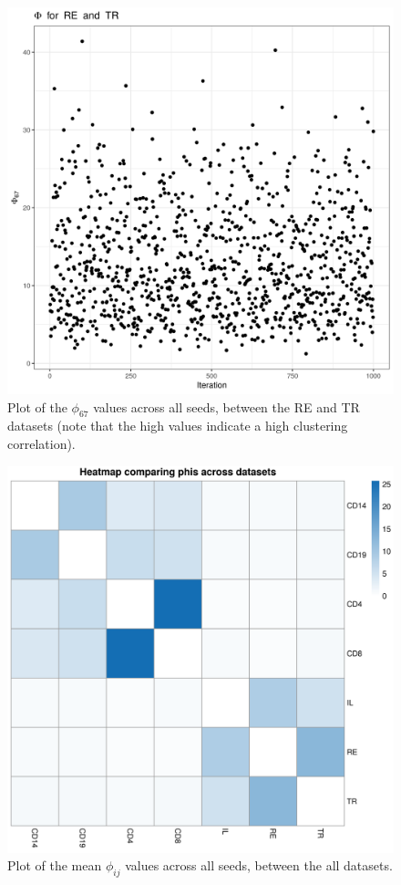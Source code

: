 \documentclass[12pt]{article} %
\begin{document}
	\begin{figure}[h]
		\centering
		\includegraphics[scale=0.75]{Images/Biology_data/Set_1000/All_datasets/Phi_series_plots/file_1_Phi_67.png}
		\caption{Plot of the $\phi_{67}$ values across all seeds, between the RE and TR datasets (note that the high values indicate a high clustering correlation).}
		\label{fig:results:cedar_2:mdi_re_tr_phi_series_plot}
	\end{figure}
	
	
	\begin{figure}[h]
		\centering
		\includegraphics[scale=0.75]{Images/Biology_data/Set_1000/All_datasets/Phi_heatmap_1.png}
		\caption{Plot of the mean $\phi_{ij}$ values across all seeds, between the all datasets.}
		\label{fig:results:cedar_2:mdi_phi_heatmap}
	\end{figure}
	
\end{document}
